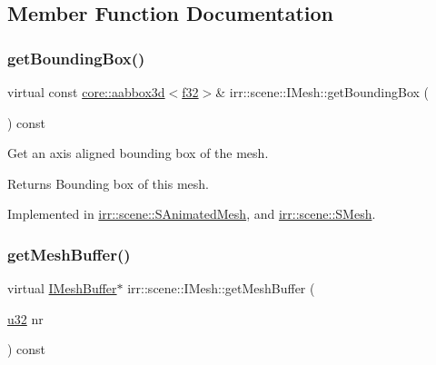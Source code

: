 \subsection{Member Function Documentation}
\mbox{\label{classirr_1_1scene_1_1IMesh_ada6ecee9cbebed8bb67fd92872552ea0}} 
\subsubsection{\texorpdfstring{get\+Bounding\+Box()}{getBoundingBox()}}
{\footnotesize\ttfamily virtual const \hyperlink{classirr_1_1core_1_1aabbox3d}{core\+::aabbox3d}$<$\hyperlink{namespaceirr_a0277be98d67dc26ff93b1a6a1d086b07}{f32}$>$\& irr\+::scene\+::\+I\+Mesh\+::get\+Bounding\+Box (\begin{DoxyParamCaption}{ }\end{DoxyParamCaption}) const\hspace{0.3cm}{\ttfamily [pure virtual]}}



Get an axis aligned bounding box of the mesh. 

\begin{DoxyReturn}{Returns}
Bounding box of this mesh. 
\end{DoxyReturn}


Implemented in \hyperlink{structirr_1_1scene_1_1SAnimatedMesh_a1494406ce8f11d47fd1e3b4af825e88f}{irr\+::scene\+::\+S\+Animated\+Mesh}, and \hyperlink{structirr_1_1scene_1_1SMesh_a379e330c863acdade37e65275903158d}{irr\+::scene\+::\+S\+Mesh}.

\mbox{\label{classirr_1_1scene_1_1IMesh_a2cd1a04b396235101f426befba0c5b82}} 
\subsubsection{\texorpdfstring{get\+Mesh\+Buffer()}{getMeshBuffer()}\hspace{0.1cm}{\footnotesize\ttfamily [1/2]}}
{\footnotesize\ttfamily virtual \hyperlink{classirr_1_1scene_1_1IMeshBuffer}{I\+Mesh\+Buffer}$\ast$ irr\+::scene\+::\+I\+Mesh\+::get\+Mesh\+Buffer (\begin{DoxyParamCaption}\item[{\hyperlink{namespaceirr_a0416a53257075833e7002efd0a18e804}{u32}}]{nr }\end{DoxyParamCaption}) const\hspace{0.3cm}{\ttfamily [pure virtual]}}



